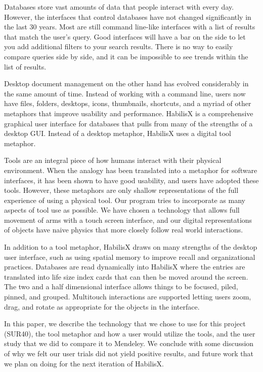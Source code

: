 \documentclass{article}
\begin{document}
Databases store vast amounts of data that people interact with every day.  However, the interfaces that control databases have not changed significantly in the last 30 years.  Most are still command line-like  interfaces with a list of results that match the user's query.  Good interfaces will have a bar on the side to let you add additional filters to your search results.  There is no way to easily compare queries side by side, and it can be impossible to see trends within the list of results.

Desktop document management on the other hand has evolved considerably in the same amount of time.  Instead of working with a command line, users now have files, folders, desktops, icons, thumbnails, shortcuts, and a myriad of other metaphors that improve usability and performance.   HabilisX is a comprehensive graphical user interface for databases that pulls from many of the strengths of a desktop GUI. Instead of a desktop metaphor, HabilisX uses a digital tool metaphor.

Tools are an integral piece of how humans interact with their physical environment.  When the analogy has been translated into a metaphor for software interfaces, it has been shown to have good usability, and users have adopted these tools.  However, these metaphors are only shallow representations of the full experience of using a physical tool.  Our program tries to incorporate as many aspects of tool use as possible.  We have chosen a technology that allows full movement of arms with a touch screen interface, and our digital representations of objects have naive physics that more closely follow real world interactions.

In addition to a tool metaphor, HabilisX draws on many strengths of the desktop user interface, such as using spatial memory to improve recall and organizational practices.  Databases are read dynamically into HabilisX where the entries are translated into life size index cards that can then be moved around the screen.  The two and a half dimensional interface allows things to be focused, piled, pinned, and grouped.  Multitouch interactions are supported letting users zoom, drag, and rotate as appropriate for the objects in the interface. 

In this paper, we describe the technology that we chose to use for this project (SUR40), the tool metaphor and how a user would utilize the tools, and the user study that we did to compare it to Mendeley.  We conclude with some discussion of why we felt our user trials did not yield positive results, and future work that we plan on doing for the next iteration of HabilisX.
\end{document}
